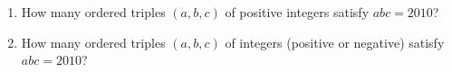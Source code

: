 \begin{enumerate}
\item[(a)] How many ordered triples $(a,b,c)$ of positive integers satisfy $abc=2010$?
\item[(b)] How many ordered triples $(a,b,c)$ of integers (positive or negative) satisfy $abc=2010$?
\end{enumerate}
